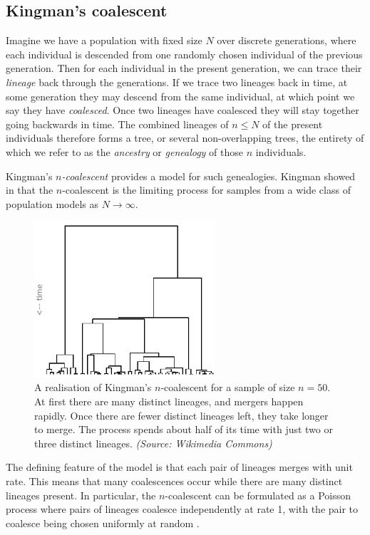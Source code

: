 \documentclass[fleqn]{article}
\theoremstyle{definition}
\begin{document}
\subsection{Kingman's coalescent}
Imagine we have a population with fixed size $N$ over discrete generations, where each individual is descended from one randomly chosen individual of the previous generation. Then for each individual in the present generation, we can trace their \emph{lineage} back through the generations. 
If we trace two lineages back in time, at some generation they may descend from the same individual, at which point we say they have \emph{coalesced}. Once two lineages have coalesced they will stay together going backwards in time.
The combined lineages of $n\leq N$ of the present individuals therefore forms a tree, or several non-overlapping trees, the entirety of which we refer to as the \emph{ancestry} or \emph{genealogy} of those $n$ individuals.

Kingman's \emph{$n$-coalescent} provides a model for such genealogies. Kingman showed in \citep{kingman1982gene, kingman1982coal, kingman1982exch} that  the $n$-coalescent is the limiting process for samples from a wide class of population models as $N\to\infty$.

\begin{figure}
\centering
\includegraphics[width=0.6\textwidth]{kingman.png}
\caption{A realisation of Kingman's $n$-coalescent for a sample of size $n=50$. At first there are many distinct lineages, and mergers happen rapidly. Once there are fewer distinct lineages left, they take longer to merge. The process spends about half of its time with just two or three distinct lineages. \textit{(Source: Wikimedia Commons)}}
\label{fig:kingman}
\end{figure}

The defining feature of the model is that each pair of lineages merges with unit rate. This means that many coalescences occur while there are many distinct lineages present.
In particular, the $n$-coalescent can be formulated as a Poisson process where pairs of lineages coalesce independently at rate 1, with the pair to coalesce being chosen uniformly at random \citep[Section 3.2]{wakeley2009}.
\end{document}
